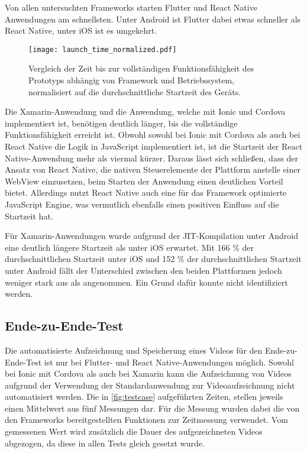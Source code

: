 Von allen untersuchten Frameworks starten Flutter und React Native Anwendungen am schnellsten.
Unter Android ist Flutter dabei etwas schneller als React Native, unter iOS ist es umgekehrt.

\begin{figure}[ht]
  \centering 
  \texttt{[image: launch\_time\_normalized.pdf]}
  \caption{Vergleich der Zeit bis zur vollständigen Funktionsfähigkeit des Prototyps abhängig von Framework und Betriebssystem, normalisiert auf die durchschnittliche Startzeit des Geräts.}
  \label{fig:launch_time_normalized}
\end{figure}
Die Xamarin-Anwendung und die Anwendung, welche mit Ionic und Cordova implementiert ist, benötigen deutlich länger, bis die vollständige Funktionsfähigkeit erreicht ist.
Obwohl sowohl bei Ionic mit Cordova als auch bei React Native die Logik in JavaScript implementiert ist, ist die Startzeit der React Native-Anwendung mehr als viermal kürzer.
Daraus lässt sich schließen, dass der Ansatz von React Native, die nativen Steuerelemente der Plattform anstelle einer WebView einzusetzen, beim Starten der Anwendung einen deutlichen Vorteil bietet.
Allerdings nutzt React Native auch eine für das Framework optimierte JavaScript Engine, was vermutlich ebenfalls einen positiven Einfluss auf die Startzeit hat.

Für Xamarin-Anwendungen wurde aufgrund der \ac{JIT}-Kompilation unter Android eine deutlich längere Startzeit als unter iOS erwartet.
Mit 166 \% der durchschnittlichen Startzeit unter iOS und 152 \% der durchschnittlichen Startzeit unter Android fällt der Unterschied zwischen den beiden Plattformen jedoch weniger stark aus als angenommen.
Ein Grund dafür konnte nicht identifiziert werden.

\subsection{Ende-zu-Ende-Test}

Die automatisierte Aufzeichnung und Speicherung eines Videos für den Ende-zu-Ende-Test ist nur bei Flutter- und React Native-Anwendungen möglich.
Sowohl bei Ionic mit Cordova als auch bei Xamarin kann die Aufzeichnung von Videos aufgrund der Verwendung der Standardanwendung zur Videoaufzeichnung nicht automatisiert werden.
Die in \autoref{fig:testcase} aufgeführten Zeiten, stellen jeweils einen Mittelwert aus fünf Messungen dar.
Für die Messung wurden dabei die von den Frameworks bereitgestellten Funktionen zur Zeitmessung verwendet.
Vom gemessenen Wert wird zusätzlich die Dauer des aufgezeichneten Videos abgezogen, da diese in allen Tests gleich gesetzt wurde.

